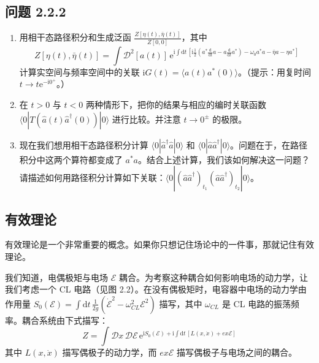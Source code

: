 \subsection*{问题 2.2.2}

\begin{enumerate}
\item[(a)] 用相干态路径积分和生成泛函 $\frac{Z[\eta(t),\bar{\eta}(t)]}{Z[0,0]}$，其中
\begin{equation*}
Z[\eta(t),\bar{\eta}(t)]=\int\mathcal{D}^2[a(t)]\,\mathrm{e}^{\mathrm{i}\int\mathrm{d}t\,\left[\mathrm{i}\frac{1}{2}\left(a^*\frac{\mathrm{d}}{\mathrm{d}t}a-a\frac{\mathrm{d}}{\mathrm{d}t}a^*\right)-\omega_0a^*a-\bar{\eta}a-\eta a^*\right]}
\end{equation*}
计算实空间与频率空间中的关联 $\mathrm{i}G(t)=\langle a(t)a^*(0)\rangle$。（提示：用复时间 $t\to t\mathrm{e}^{-\mathrm{i}0^+}$。）
\item[(b)] 在 $t>0$ 与 $t<0$ 两种情形下，把你的结果与相应的编时关联函数 $\langle 0|T(\hat{a}(t)\hat{a}^\dagger(0))|0\rangle$ 进行比较。并注意 $t\to 0^\pm$ 的极限。
\item[(c)] 现在我们想用相干态路径积分计算 $\langle 0|\hat{a}^\dagger\hat{a}|0\rangle$ 和 $\langle 0|\hat{a}\hat{a}^\dagger|0\rangle$。问题在于，在路径积分中这两个算符都变成了 $a^*a$。结合上述计算，我们该如何解决这一问题？请描述如何用路径积分计算如下关联：$\langle 0|(\hat{a}\hat{a}^\dagger)_{t_1}(\hat{a}\hat{a}^\dagger)_{t_2}|0\rangle$。
\end{enumerate}

\subsection{有效理论}

\begin{keypoints}
\item 有效理论是一个非常重要的概念。如果你只想记住场论中的一件事，那就记住有效理论。
\end{keypoints}

我们知道，电偶极矩与电场 $\mathcal{E}$ 耦合。为考察这种耦合如何影响电场的动力学，让我们考虑一个 CL 电路（见图 2.2）。在没有偶极矩时，电容器中电场的动力学由作用量 $S_0(\mathcal{E})=\int\mathrm{d}t\,\frac{1}{2g}(\dot{\mathcal{E}}^2-\omega_{CL}^2\mathcal{E}^2)$ 描写，其中 $\omega_{CL}$ 是 CL 电路的振荡频率。耦合系统由下式描写：
\begin{equation*}
Z=\int\mathcal{D}x\,\mathcal{D}\mathcal{E}\,\mathrm{e}^{\mathrm{i}S_0(\mathcal{E})+\mathrm{i}\int\mathrm{d}t\,[L(x,\dot{x})+ex\mathcal{E}]}
\end{equation*}
其中 $L(x,\dot{x})$ 描写偶极子的动力学，而 $ex\mathcal{E}$ 描写偶极子与电场之间的耦合。

